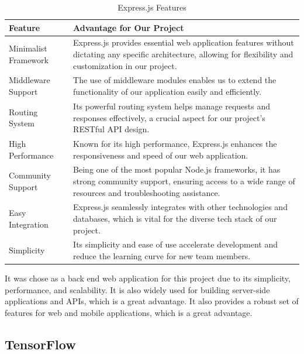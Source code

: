 \begin{table}[H]
    \centering
    \begin{tabularx}{\textwidth}{|l|X|}
        \hline
        \textbf{Feature}     & \textbf{Advantage for Our Project}                                                                                                                              \\
        \hline
        Minimalist Framework & Express.js provides essential web application features without dictating any specific architecture, allowing for flexibility and customization in our project.  \\
        \hline
        Middleware Support   & The use of middleware modules enables us to extend the functionality of our application easily and efficiently.                                                 \\
        \hline
        Routing System       & Its powerful routing system helps manage requests and responses effectively, a crucial aspect for our project's RESTful API design.                             \\
        \hline
        High Performance     & Known for its high performance, Express.js enhances the responsiveness and speed of our web application.                                                        \\
        \hline
        Community Support    & Being one of the most popular Node.js frameworks, it has strong community support, ensuring access to a wide range of resources and troubleshooting assistance. \\
        \hline
        Easy Integration     & Express.js seamlessly integrates with other technologies and databases, which is vital for the diverse tech stack of our project.                               \\
        \hline
        Simplicity           & Its simplicity and ease of use accelerate development and reduce the learning curve for new team members.                                                       \\
        \hline
    \end{tabularx}
    \label{tab:expressJS}
    \caption{Express.js Features}
\end{table}

It was chose as a back end web application for this project due to its simplicity, performance, and scalability. It is also widely used for building server-side applications and APIs, which is a great advantage. It also provides a robust set of features for web and mobile applications, which is a great advantage.

\subsection{TensorFlow}



